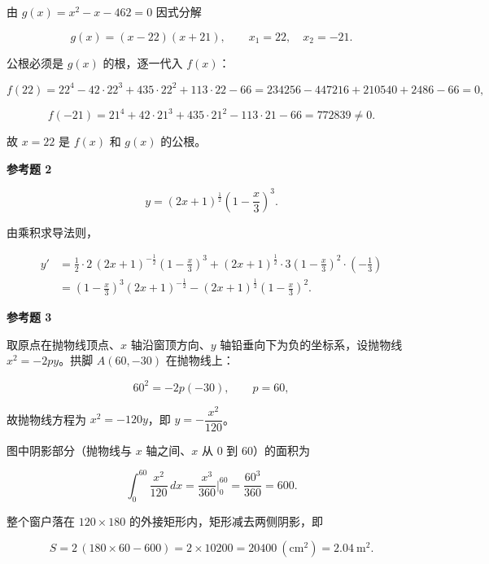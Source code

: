 \begin{answer}
由 $g(x)=x^2-x-462=0$ 因式分解

\nopagebreak[4]
\[
g(x)=(x-22)(x+21),
\qquad
x_1=22,\quad x_2=-21.
\]

公根必须是 $g(x)$ 的根，逐一代入 $f(x)$：

\nopagebreak[4]
\[
f(22)=22^4-42\cdot22^3+435\cdot22^2+113\cdot22-66
=234256-447216+210540+2486-66=0,
\]

\nopagebreak[4]
\[
f(-21)=21^4+42\cdot21^3+435\cdot21^2-113\cdot21-66=772839\ne0.
\]

故 $x=22$ 是 $f(x)$ 和 $g(x)$ 的公根。

\textbf{参考题 2}

\nopagebreak[4]
\[
y=\left(2x+1\right)^{\frac12}\left(1-\frac{x}{3}\right)^3.
\]

由乘积求导法则，

\nopagebreak[4]
\[
\begin{aligned}
y'
&=\frac12\cdot2\,(2x+1)^{-\frac12}\left(1-\frac{x}{3}\right)^3
+\left(2x+1\right)^{\frac12}\cdot3\left(1-\frac{x}{3}\right)^2\cdot\left(-\frac13\right)\\
&=\left(1-\frac{x}{3}\right)^3(2x+1)^{-\frac12}
-\left(2x+1\right)^{\frac12}\left(1-\frac{x}{3}\right)^2.
\end{aligned}
\]

\textbf{参考题 3}

取原点在抛物线顶点、$x$ 轴沿窗顶方向、$y$ 轴铅垂向下为负的坐标系，设抛物线 $x^2=-2py$。拱脚 $A(60,-30)$ 在抛物线上：

\nopagebreak[4]
\[
60^2=-2p(-30),
\qquad
p=60,
\]

故抛物线方程为 $x^2=-120y$，即 $y=-\dfrac{x^2}{120}$。

图中阴影部分（抛物线与 $x$ 轴之间、$x$ 从 $0$ 到 $60$）的面积为

\nopagebreak[4]
\[
\int_0^{60}\frac{x^2}{120}\,dx
=\frac{x^3}{360}\bigg|_0^{60}
=\frac{60^3}{360}=600.
\]

整个窗户落在 $120\times180$ 的外接矩形内，矩形减去两侧阴影，即

\nopagebreak[4]
\[
S=2\,(180\times60-600)=2\times10200=20400\ (\mathrm{cm^2})=2.04\ \mathrm{m^2}.
\]
\nopagebreak[4]
\begin{center}\end{center}
\nopagebreak[4]

\end{answer}